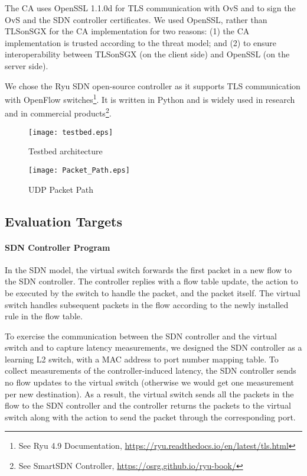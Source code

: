{The CA uses OpenSSL 1.1.0d for TLS communication with OvS and to sign the OvS and the SDN controller certificates. 
We used OpenSSL, rather than TLSonSGX for the CA implementation for two reasons: 
(1) the CA implementation is trusted according to the threat model; 
and (2) to ensure interoperability between TLSonSGX (on the client side) and OpenSSL (on the server side).

We chose the Ryu SDN open-source controller as it supports TLS communication with OpenFlow switches\footnote{See Ryu 4.9 Documentation, \url{https://ryu.readthedocs.io/en/latest/tls.html}}.
It is written in Python and is widely used in research \cite{arbettu:2016} and in commercial products\footnote{See SmartSDN Controller, \url{https://osrg.github.io/ryu-book/}}.

\begin{figure}[t]
	\parbox{.5\linewidth}{
		\centering
		\texttt{[image: testbed.eps]}
		\caption{Testbed architecture}
		\label{fig:testbed}
	}%
	\parbox{.5\linewidth}{
		\centering
		\texttt{[image: Packet\_Path.eps]}
		\caption{UDP Packet Path}
		\label{fig:Packet_Path}
	}
\end{figure}

\subsection{Evaluation Targets}
\label{sec:planned_measurements}

\paragraph{SDN Controller Program}
In the SDN model, the virtual switch forwards the first packet in a new flow to the SDN controller.
The controller replies with a flow table update, the action to be executed by the switch to handle the packet, and the packet itself.
The virtual switch handles subsequent packets in the flow according to the newly installed rule in the flow table.

To exercise the communication between the SDN controller and the virtual switch and to capture latency measurements, we designed the SDN controller as a learning L2 switch, with a MAC address to port number mapping table.
To collect measurements of the controller-induced latency, the SDN controller sends no flow updates to the virtual switch (otherwise we would get one measurement per new destination).
As a result, the virtual switch sends all the packets in the flow to the SDN controller and the controller returns the packets to the virtual switch along with the action to send the packet through the corresponding port.

}
